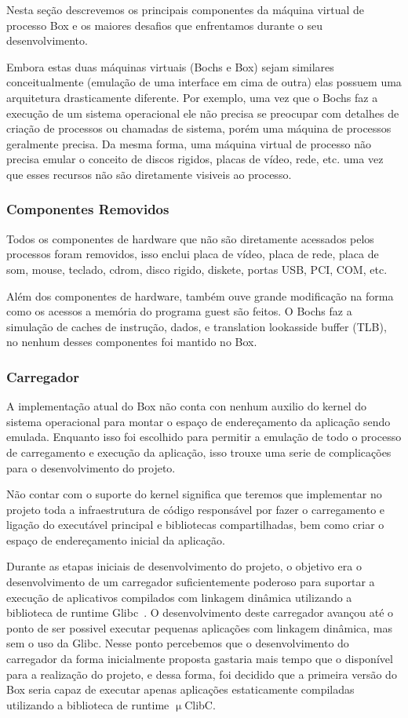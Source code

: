 \documentclass[11pt,twoside]{article}
\begin{document}
Nesta seção descrevemos os principais componentes da máquina virtual 
de processo Box e os maiores desafios que enfrentamos durante o seu 
desenvolvimento.

Embora estas duas máquinas virtuais (Bochs e Box) sejam similares 
conceitualmente (emulação de uma interface em cima de outra) elas
possuem uma arquitetura drasticamente diferente. Por exemplo, 
uma vez que o Bochs faz a execução de um sistema operacional ele
não precisa se preocupar com detalhes de criação de processos ou
chamadas de sistema, porém uma máquina de processos geralmente
precisa. Da mesma forma, uma máquina virtual de processo não precisa
emular o conceito de discos rigidos, placas de vídeo, rede, etc. uma
vez que esses recursos não são diretamente visiveis ao processo.


\subsubsection{Componentes Removidos}

Todos os componentes de hardware que não são diretamente acessados
pelos processos foram removidos, isso enclui placa de vídeo, placa de
rede, placa de som, mouse, teclado, cdrom, disco rigido, diskete, portas
USB, PCI, COM, etc.

Além dos componentes de hardware, também ouve grande modificação na 
forma como os acessos a memória do programa guest são feitos. O Bochs 
faz a simulação de caches de instrução, dados, e translation lookasside 
buffer (TLB), no nenhum desses componentes foi mantido no Box.

\subsubsection{Carregador}

A implementação atual do Box não conta con nenhum auxilio do kernel do
sistema operacional para montar o espaço de endereçamento da aplicação
sendo emulada. Enquanto isso foi escolhido para permitir a emulação de
todo o processo de carregamento e execução da aplicação, isso trouxe 
uma serie de complicações para o desenvolvimento do projeto.

Não contar com o suporte do kernel significa que teremos que implementar
no projeto toda a infraestrutura de código responsável por fazer o 
carregamento e ligação do executável principal e bibliotecas compartilhadas,
bem como criar o espaço de endereçamento inicial da aplicação.

Durante as etapas iniciais de desenvolvimento do projeto, o objetivo era
o desenvolvimento de um carregador suficientemente poderoso para suportar
a execução de aplicativos compilados com linkagem dinâmica utilizando a
biblioteca de runtime Glibc~\cite{glibc}. O desenvolvimento deste carregador
avançou até o ponto de ser possivel executar pequenas aplicações com linkagem
dinâmica, mas sem o uso da Glibc. Nesse ponto percebemos que o desenvolvimento
do carregador da forma inicialmente proposta gastaria mais tempo que o 
disponível para a realização do projeto, e dessa forma, foi decidido que
a primeira versão do Box seria capaz de executar apenas aplicações 
estaticamente compiladas utilizando a biblioteca de runtime $\upmu$ClibC.
\end{document}
